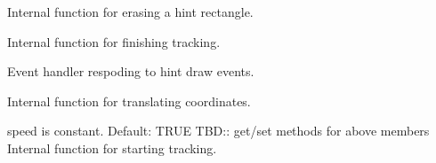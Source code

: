 Internal function for erasing a hint rectangle.


\label{cbhintanimationpluginfinishtracking}


Internal function for finishing tracking.


\label{cbhintanimationpluginondrawhintrect}


Event handler respoding to hint draw events.


\label{cbhintanimationpluginrecttoscr}


Internal function for translating coordinates.


\label{cbhintanimationpluginstarttracking}


speed is constant. Default: TRUE
TBD:: get/set methods for above members
Internal function for starting tracking.

